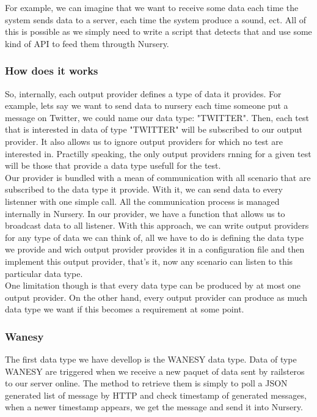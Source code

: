 \documentclass[12pt]{article}
\begin{document}
For example, we can imagine that we want to receive some data each time the system sends data to a server, each time the system produce a sound, ect. All of this is possible as we simply need to write a script that detects that and use some kind of API to feed them througth Nursery.\\

\subsubsection{How does it works}

So, internally, each output provider defines a type of data it provides. For example, lets say we want to send data to nursery each time someone put a message on Twitter, we could name our data type: "TWITTER". Then, each test that is interested in data of type "TWITTER" will be subscribed to our output provider. It also allows us to ignore output providers for which no test are interested in. Practilly speaking, the only output providers rnning for a given test will be those that provide a data type usefull for the test.\\

Our provider is bundled with a mean of communication with all scenario that are subscribed to the data type it provide. With it, we can send data to every listenner with one simple call. All the communication process is managed internally in Nursery.
In our provider, we have a function that allows us to broadcast data to all listener. With this approach, we can write output providers for any type of data we can think of, all we have to do is defining the data type we provide and wich output provider provides it in a configuration file and then implement this output provider, that's it, now any scenario can listen to this particular data type.\\

One limitation though is that every data type can be produced by at most one output provider. On the other hand, every output provider can produce as much data type we want if this becomes a requirement at some point.\\

\subsubsection{Wanesy}

The first data type we have devellop is the WANESY data type. Data of type WANESY are triggered when we receive a new paquet of data sent by \gls{railsteros} to our server online. The method to retrieve them is simply to poll a JSON generated list of message by HTTP and check timestamp of generated messages, when a newer timestamp appears, we get the message and send it into Nursery.\\
\end{document}
